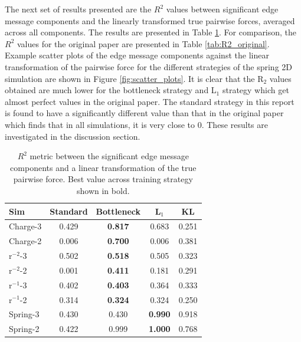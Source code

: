 \documentclass[11pt]{article}
\begin{document}
The next set of results presented are the $R^2$ values between significant edge message components and the linearly transformed true pairwise forces, averaged across all components. The results are presented in Table \ref{tab:R2}. For comparison, the $R^2$ values for the original paper are presented in Table \ref{tab:R2_original}. Example scatter plots of the edge message components against the linear transformation of the pairwise force for the different strategies of the spring 2D simulation are shown in Figure \ref{fig:scatter_plots}. It is clear that the R$_{2}$ values obtained are much lower for the bottleneck strategy and L$_{1}$ strategy which get almost perfect values in the original paper. The standard strategy in this report is found to have a significantly different value than that in the original paper which finds that in all simulations, it is very close to 0. These results are investigated in the discussion section.
    \begin{table}[H]
        \centering
        \begin{tabular}{lcccc}
        \hline
        Sim & Standard & Bottleneck & L$_1$ & KL \\
        \hline
        Charge-3 & 0.429 & \textbf{0.817} & 0.683 & 0.251 \\
        Charge-2 & 0.006 & \textbf{0.700} & 0.006 & 0.381 \\
        r$^{-2}$-3 & 0.502 & \textbf{0.518} & 0.505 & 0.323 \\
        r$^{-2}$-2 & 0.001 & \textbf{0.411} & 0.181 & 0.291 \\
        r$^{-1}$-3 & 0.402 & \textbf{0.403} & 0.364 & 0.333 \\
        r$^{-1}$-2 & 0.314 & \textbf{0.324} & 0.324 & 0.250 \\
        Spring-3 & 0.430 & 0.430 & \textbf{0.990} & 0.918 \\
        Spring-2 & 0.422 & 0.999 & \textbf{1.000} & 0.768 \\

        \hline
        \end{tabular}
        \caption{$R^2$ metric between the significant edge message components and a linear transformation of the true pairwise force. Best value across training strategy shown in bold.}
        \label{tab:R2}
    \end{table}
\end{document}
